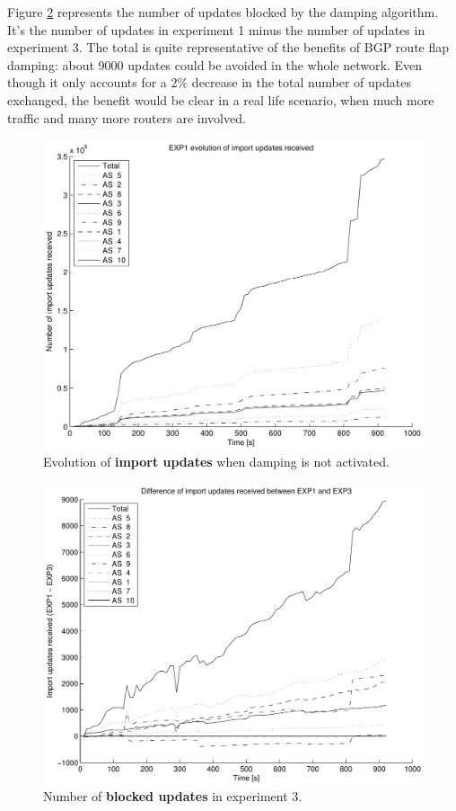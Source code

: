 \documentclass[a4paper,english]{IEEEtran}
\begin{document}
Figure \ref{fig_diff_updates} represents the number of updates blocked by the damping algorithm. 
It's the number of updates in experiment 1 minus the number of updates in experiment 3. The 
total is quite representative of the benefits of BGP route flap damping: about 9000 updates 
could be avoided in the whole network. Even though it only accounts for a 2\% decrease 
in the total number of updates exchanged, the benefit would be clear in a real life scenario, 
when much more traffic and many more routers are involved.

\begin{figure}
\begin{center}
\includegraphics[scale=.5]{img/exp1_updates.pdf}
\end{center}
\caption{Evolution of \textbf{import updates} when damping is not activated.}
\label{fig_exp1_updates}
\end{figure}

\begin{figure}
\begin{center}
\includegraphics[scale=.5]{img/diff_exp1_exp3_updates.pdf}
\end{center}
\caption{Number of \textbf{blocked updates} in experiment 3.}
\label{fig_diff_updates}
\end{figure}
\end{document}
